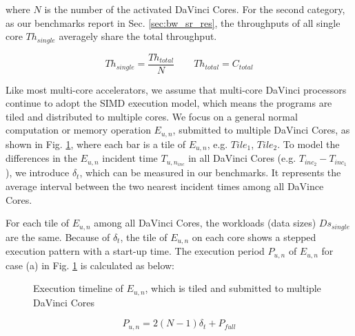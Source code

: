 \documentclass[12pt]{extbook}
\begin{document}
where $N$ is the number of the activated DaVinci Cores. For the second category, as our benchmarks report in Sec. \ref{sec:bw_sr_res}, the throughputs of all single core $Th_{single}$ averagely share the total throughput.

\begin{equation}
\label{eq:second}
Th_{single} = \frac{Th_{total}}{N} \qquad Th_{total} = C_{total} 
\end{equation}

Like most multi-core accelerators, we assume that multi-core DaVinci processors continue to adopt the SIMD execution model, which means the programs are tiled and distributed to multiple cores. We focus on a general normal computation or memory operation $E_{u, n}$, submitted to multiple DaVinci Cores, as shown in Fig. \ref{fig:multi-core}, where each bar is a tile of $E_{u, n}$, e.g. $Tile_{1}$, $Tile_{2}$. To model the differences in the $E_{u, n}$ incident time $T_{u, n_{inc}}$ in all DaVinci Cores (e.g. $T_{inc_{2}} - T_{inc_{1}}$), we introduce $\delta_{t}$, which can be measured in our benchmarks. It represents the average interval between the two nearest incident times among all DaVince Cores.

For each tile of $E_{u, n}$ among all DaVinci Cores, the workloads (data sizes) $Ds_{single}$ are the same. Because of $\delta_{t}$, the tile of $E_{u, n}$ on each core shows a stepped execution pattern with a start-up time. The execution period $P_{u, n}$ of $E_{u, n}$ for case (a) in Fig. \ref{fig:multi-core} is calculated as below:

\begin{figure}[tbp]
    \caption{
    Execution timeline of $E_{u, n}$, which is tiled and submitted to multiple DaVinci Cores}
    \label{fig:multi-core}
    \end{figure}    

\begin{equation}
P_{u, n} = 2 (N - 1) \delta_{t} + P_{full}
\end{equation}
\end{document}
